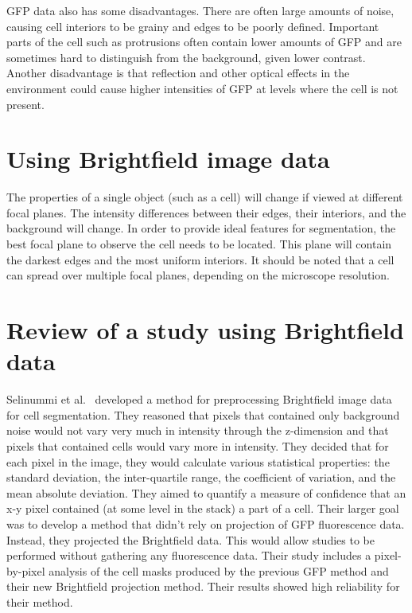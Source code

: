 GFP data also has some disadvantages. There are often large amounts of noise, causing cell interiors to be grainy and edges to be poorly defined. Important parts of the cell such as protrusions often contain lower amounts of GFP and are sometimes hard to distinguish from the background, given lower contrast. Another disadvantage is that reflection and other optical effects in the environment could cause higher intensities of GFP at levels where the cell is not present.

\section{Using Brightfield image data}

The properties of a single object (such as a cell) will change if viewed at different focal planes. The intensity differences between their edges, their interiors, and the background will change. In order to provide ideal features for segmentation, the best focal plane to observe the cell needs to be located. This plane will contain the darkest edges and the most uniform interiors. It should be noted that a cell can spread over multiple focal planes, depending on the microscope resolution.

\section{Review of a study using Brightfield data}

Selinummi et al.~\cite{selinummi} developed a method for preprocessing Brightfield image data for cell segmentation. They reasoned that pixels that contained only background noise would not vary very much in intensity through the z-dimension and that pixels that contained cells would vary more in intensity. They decided that for each pixel in the image, they would calculate various statistical properties: the standard deviation, the inter-quartile range, the coefficient of variation, and the mean absolute deviation. They aimed to quantify a measure of confidence that an x-y pixel contained (at some level in the stack) a part of a cell. Their larger goal was to develop a method that didn't rely on projection of GFP fluorescence data. Instead, they projected the Brightfield data. This would allow studies to be performed without gathering any fluorescence data. Their study includes a pixel-by-pixel analysis of the cell masks produced by the previous GFP method and their new Brightfield projection method. Their results showed high reliability for their method.

